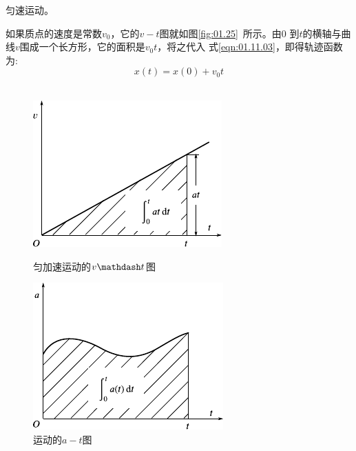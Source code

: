 \setcounter{example}{0}
\example 匀速运动。

如果质点的速度是常数$v_0$，它的$v-t$图就如图\ref{fig:01.25}~所示。由0
到$t$的横轴与曲线$v$围成一个长方形，它的面积是$v_0t$，将之代入
式\eqref{eqn:01.11.03}，即得轨迹函数为:
\begin{equation}\label{eqn:01.11.04}
 x\left(t\right)=x\left(0\right)+v_0 t
\end{equation}
~\vspace{-1.5em}
\begin{figure}[!h]
 \begin{minipage}[b]{14em}
 \centering
 \includegraphics[width=0.8\linewidth]{figure/fig01.26}
 \caption{匀加速运动的$v \mathdash t$图}
 \label{fig:01.26}
 \end{minipage}\hfill
 \begin{minipage}[b]{14em}
 \centering
 \includegraphics[width=0.8\linewidth]{figure/fig01.27}
 \caption{运动的$a-t$图}
 \label{fig:01.27}
 \end{minipage}
\end{figure}

